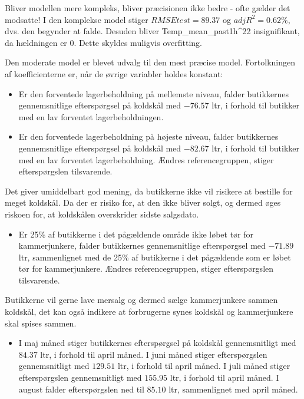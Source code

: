 \documentclass[
  12pt,
  a4paper,
  DIV=11,
  numbers=noendperiod]{scrartcl}
\providecommand{\tightlist}{%
  \setlength{\itemsep}{0pt}\setlength{\parskip}{0pt}}\usepackage{longtable,booktabs,array}
\begin{document}
Bliver modellen mere kompleks, bliver præcisionen ikke bedre - ofte
gælder det modsatte! I den komplekse model stiger \(RMSEtest=89.37\) og
\(adjR^2 = 0.62\%\), dvs. den begynder at falde. Desuden bliver
Temp\_mean\_past1h\^{}22 insignifikant, da hældningen er 0. Dette
skyldes muligvis overfitting.

Den moderate model er blevet udvalg til den mest præcise model.
Fortolkningen af koefficienterne er, når de øvrige variabler holdes
konstant:

\begin{itemize}
\item
  Er den forventede lagerbeholdning på mellemste niveau, falder
  butikkernes gennemsnitlige efterspørgsel på koldskål med \(-76.57\)
  ltr, i forhold til butikker med en lav forventet lagerbeholdningen.
\item
  Er den forventede lagerbeholdning på højeste niveau, falder
  butikkernes gennemsnitlige efterspørgsel på koldskål med \(-82.67\)
  ltr, i forhold til butikker med en lav forventet lagerbeholdning.
  Ændres referencegruppen, stiger efterspørgslen tilsvarende.
\end{itemize}

Det giver umiddelbart god mening, da butikkerne ikke vil risikere at
bestille for meget koldskål. Da der er risiko for, at den ikke bliver
solgt, og dermed øges riskoen for, at koldskålen overskrider sidste
salgsdato.

\begin{itemize}
\tightlist
\item
  Er 25\% af butikkerne i det pågældende område ikke løbet tør for
  kammerjunkere, falder butikkernes gennemsnitlige efterspørgsel med
  \(-71.89\) ltr, sammenlignet med de 25\% af butikkerne i det
  pågældende som er løbet tør for kammerjunkere. Ændres
  referencegruppen, stiger efterspørgslen tilsvarende.
\end{itemize}

Butikkerne vil gerne lave mersalg og dermed sælge kammerjunkere sammen
koldskål, det kan også indikere at forbrugerne synes koldskål og
kammerjunkere skal spises sammen.

\begin{itemize}
\tightlist
\item
  I maj måned stiger butikkernes efterspørgsel på koldskål
  gennemsnitligt med \(84.37\) ltr, i forhold til april måned. I juni
  måned stiger efterspørgslen gennemsnitligt med \(129.51\) ltr, i
  forhold til april måned. I juli måned stiger efterspørgslen
  gennemsnitligt med \(155.95\) ltr, i forhold til april måned. I august
  falder efterspørgslen ned til \(85.10\) ltr, sammenlignet med april
  måned.
\end{itemize}
\end{document}
